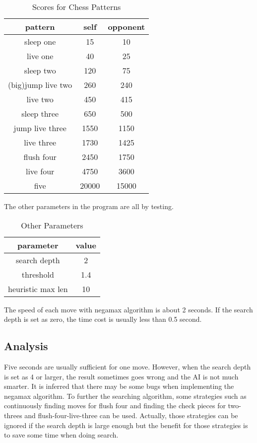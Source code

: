 \documentclass[conference,compsoc]{IEEEtran}
\begin{document}
\begin{table}[ht]
\caption{Scores for Chess Patterns}
\centering
\begin{tabular}{ccc}
\hline
\textbf{pattern}   & \textbf{self} & \textbf{opponent} \\ \hline
sleep one          & 15            & 10                \\
live one           & 40            & 25                \\
sleep two          & 120           & 75                \\
(big)jump live two & 260           & 240               \\
live two           & 450           & 415               \\
sleep three        & 650           & 500               \\
jump live three    & 1550          & 1150              \\
live three         & 1730          & 1425              \\
flush four         & 2450          & 1750              \\
live four          & 4750          & 3600              \\
five               & 20000         & 15000             \\ \hline
\end{tabular}
\end{table}

The other parameters in the program are all by testing. 

\begin{table}[ht]
\caption{Other Parameters}
\centering
\begin{tabular}{cc}
\hline
\textbf{parameter} & \textbf{value} \\ \hline
search depth       & 2              \\
threshold          & 1.4            \\
heuristic max len  & 10             \\ \hline
\end{tabular}
\end{table}

The speed of each move with negamax algorithm is about 2 seconds. If the search depth is set as zero, the time cost is usually less than 0.5 second.


\subsection{Analysis}
Five seconds are usually sufficient for one move. However, when the search depth is set as 4 or larger, the result sometimes goes wrong and the AI is not much smarter. It is inferred that there may be some bugs when implementing the negamax algorithm. 
To further the searching algorithm, some strategies such as continuously finding moves for flush four and finding the check pieces for two-threes and flush-four-live-three can be used. Actually, those strategies can be ignored if the search depth is large enough but the benefit for those strategies is to save some time when doing search. 
\end{document}
